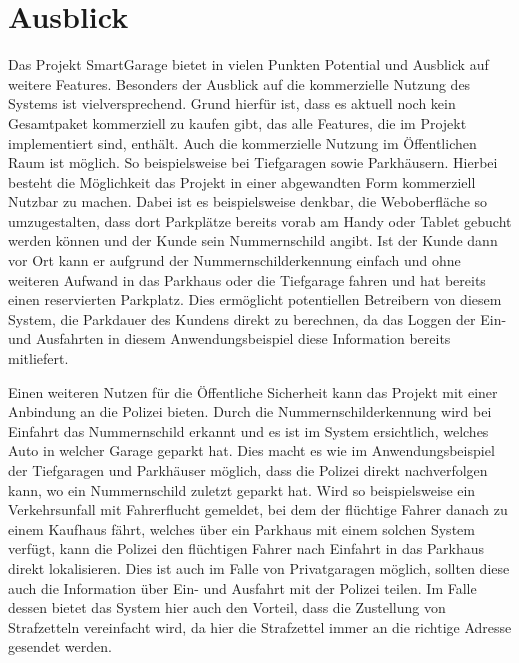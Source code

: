 \section{Ausblick}
Das Projekt SmartGarage bietet in vielen Punkten Potential und Ausblick auf weitere Features. Besonders der Ausblick auf die kommerzielle Nutzung des Systems ist vielversprechend. Grund hierfür ist, dass es aktuell noch kein Gesamtpaket kommerziell zu kaufen gibt, das alle Features, die im Projekt implementiert sind, enthält. Auch die kommerzielle Nutzung im Öffentlichen Raum ist möglich. So beispielsweise bei Tiefgaragen sowie Parkhäusern. Hierbei besteht die Möglichkeit das Projekt in einer abgewandten Form kommerziell Nutzbar zu machen. Dabei ist es beispielsweise denkbar, die Weboberfläche so umzugestalten, dass dort Parkplätze bereits vorab am Handy oder Tablet gebucht werden können und der Kunde sein Nummernschild angibt. Ist der Kunde dann vor Ort kann er aufgrund der Nummernschilderkennung einfach und ohne weiteren Aufwand in das Parkhaus oder die Tiefgarage fahren und hat bereits einen reservierten Parkplatz. Dies ermöglicht potentiellen Betreibern von diesem System, die Parkdauer des Kundens direkt zu berechnen, da das Loggen der Ein- und Ausfahrten in diesem Anwendungsbeispiel diese Information bereits mitliefert. 

Einen weiteren Nutzen für die Öffentliche Sicherheit kann das Projekt mit einer Anbindung an die Polizei bieten. Durch die Nummernschilderkennung wird bei Einfahrt das Nummernschild erkannt und es ist im System ersichtlich, welches Auto in welcher Garage geparkt hat. Dies macht es wie im Anwendungsbeispiel der Tiefgaragen und Parkhäuser möglich, dass die Polizei direkt nachverfolgen kann, wo ein Nummernschild zuletzt geparkt hat. Wird so beispielsweise ein Verkehrsunfall mit Fahrerflucht gemeldet, bei dem der flüchtige Fahrer danach zu einem Kaufhaus fährt, welches über ein Parkhaus mit einem solchen System verfügt, kann die Polizei den flüchtigen Fahrer nach Einfahrt in das Parkhaus direkt lokalisieren. Dies ist auch im Falle von Privatgaragen möglich, sollten diese auch die Information über Ein- und Ausfahrt mit der Polizei teilen. Im Falle dessen bietet das System hier auch den Vorteil, dass die Zustellung von Strafzetteln vereinfacht wird, da hier die Strafzettel immer an die richtige Adresse gesendet werden.


